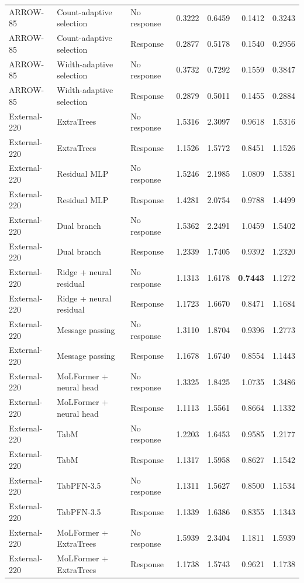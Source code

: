 \begin{longtable}{@{}lp{3.8cm}lrrrr@{}}
ARROW-85 & Count-adaptive selection & No response & 0.3222 & 0.6459 & 0.1412 & 0.3243 \\
ARROW-85 & Count-adaptive selection & Response & 0.2877 & 0.5178 & 0.1540 & 0.2956 \\
ARROW-85 & Width-adaptive selection & No response & 0.3732 & 0.7292 & 0.1559 & 0.3847 \\
ARROW-85 & Width-adaptive selection & Response & 0.2879 & 0.5011 & 0.1455 & 0.2884 \\
External-220 & ExtraTrees & No response & 1.5316 & 2.3097 & 0.9618 & 1.5316 \\
External-220 & ExtraTrees & Response & 1.1526 & 1.5772 & 0.8451 & 1.1526 \\
External-220 & Residual MLP & No response & 1.5246 & 2.1985 & 1.0809 & 1.5381 \\
External-220 & Residual MLP & Response & 1.4281 & 2.0754 & 0.9788 & 1.4499 \\
External-220 & Dual branch & No response & 1.5362 & 2.2491 & 1.0459 & 1.5402 \\
External-220 & Dual branch & Response & 1.2339 & 1.7405 & 0.9392 & 1.2320 \\
External-220 & Ridge + neural residual & No response & 1.1313 & 1.6178 & \textbf{0.7443} & 1.1272 \\
External-220 & Ridge + neural residual & Response & 1.1723 & 1.6670 & 0.8471 & 1.1684 \\
External-220 & Message passing & No response & 1.3110 & 1.8704 & 0.9396 & 1.2773 \\
External-220 & Message passing & Response & 1.1678 & 1.6740 & 0.8554 & 1.1443 \\
External-220 & MoLFormer + neural head & No response & 1.3325 & 1.8425 & 1.0735 & 1.3486 \\
External-220 & MoLFormer + neural head & Response & 1.1113 & 1.5561 & 0.8664 & 1.1332 \\
External-220 & TabM & No response & 1.2203 & 1.6453 & 0.9585 & 1.2177 \\
External-220 & TabM & Response & 1.1317 & 1.5958 & 0.8627 & 1.1542 \\
External-220 & TabPFN-3.5 & No response & 1.1311 & 1.5627 & 0.8500 & 1.1534 \\
External-220 & TabPFN-3.5 & Response & 1.1339 & 1.6386 & 0.8355 & 1.1343 \\
External-220 & MoLFormer + ExtraTrees & No response & 1.5939 & 2.3404 & 1.1811 & 1.5939 \\
External-220 & MoLFormer + ExtraTrees & Response & 1.1738 & 1.5743 & 0.9621 & 1.1738 \\

\end{longtable}
